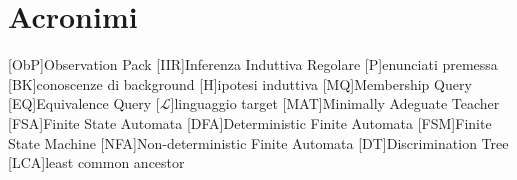 %
%
\chapter*{Acronimi}
\begin{acronym}[WYSIWYM]
[ObP]{Observation Pack}
[IIR]{Inferenza Induttiva Regolare}
[P]{enunciati premessa}
[BK]{conoscenze di background}
[H]{ipotesi induttiva}
[MQ]{Membership Query}
[EQ]{Equivalence Query}
[$\mathcal{L}$]{linguaggio target}
[MAT]{Minimally Adeguate Teacher}
[FSA]{Finite State Automata}
[DFA]{Deterministic Finite Automata}
[FSM]{Finite State Machine}
[NFA]{Non-deterministic Finite Automata}
[DT]{Discrimination Tree}
[LCA]{least common ancestor}
\end{acronym}